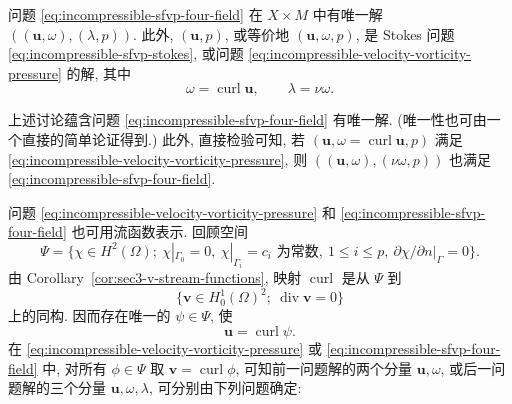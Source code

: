 \begin{Theorem}\label{thm:incompressible-sfvp-four-field-equivalence}
问题 \eqref{eq:incompressible-sfvp-four-field} 在
$X\times M$ 中有唯一解
$((\mathbf u,\omega),(\lambda,p))$.
此外, $(\mathbf u,p)$, 或等价地
$(\mathbf u,\omega,p)$, 是 Stokes 问题
\eqref{eq:incompressible-sfvp-stokes}, 或问题
\eqref{eq:incompressible-velocity-vorticity-pressure} 的解,
其中
\[
\omega=\operatorname{curl}\mathbf u,
\qquad
\lambda=\nu\omega.
\]
\end{Theorem}

\begin{Proof}
上述讨论蕴含问题
\eqref{eq:incompressible-sfvp-four-field} 有唯一解.
(唯一性也可由一个直接的简单论证得到.)
此外, 直接检验可知, 若
$(\mathbf u,\omega=\operatorname{curl}\mathbf u,p)$ 满足
\eqref{eq:incompressible-velocity-vorticity-pressure},
则 $((\mathbf u,\omega),(\nu\omega,p))$ 也满足
\eqref{eq:incompressible-sfvp-four-field}.
\end{Proof}

问题 \eqref{eq:incompressible-velocity-vorticity-pressure}
和 \eqref{eq:incompressible-sfvp-four-field}
也可用流函数表示.
回顾空间
\begin{equation}\label{eq:incompressible-stream-space-psi}
\Psi=\{\chi\in H^2(\Omega);\
\chi|_{\Gamma_0}=0,\
\chi|_{\Gamma_i}=c_i\text{ 为常数},\ 1\leq i\leq p,\
\partial\chi/\partial n|_\Gamma=0\}.
\end{equation}
由 Corollary~\ref{cor:sec3-v-stream-functions},
映射 $\operatorname{curl}$ 是从 $\Psi$ 到
\[
\{\mathbf v\in H_0^1(\Omega)^2;\
\operatorname{div}\mathbf v=0\}
\]
上的同构. 因而存在唯一的 $\psi\in\Psi$, 使
\[
\mathbf u=\operatorname{curl}\psi.
\]
在 \eqref{eq:incompressible-velocity-vorticity-pressure}
或 \eqref{eq:incompressible-sfvp-four-field} 中,
对所有 $\phi\in\Psi$ 取
$\mathbf v=\operatorname{curl}\phi$,
可知前一问题解的两个分量 $\mathbf u,\omega$,
或后一问题解的三个分量 $\mathbf u,\omega,\lambda$,
可分别由下列问题确定:


